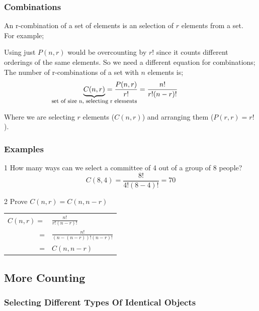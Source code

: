 \documentclass[12pt, letterpaper]{article}
\newcommand{\cul}[1]{%
		\uline{\phantom{#1}}%
		\llap{\contour{white}{#1}}%
	}
\newcommand{\exheader}[1][ex]{{\tiny{#1}\normalsize}}
\newcommand{\intextnote}[1][Also Note Lorem Ipsum]{{
				\emph{
					\begin{small}
					\begin{quote}
						\faInfoCircle\space
						{#1}
					\end{quote}
					\end{small}
		}
	}}
\begin{document}
\pagebreak

\subsubsection{Combinations} 
An r-combination of a set of elements is an \cul{unordered} selection of $r$ elements from a set. \\ 
For example;

\bigbreak

Using just $P(n,r)$ would be overcounting by $r!$ since it counts different orderings of the same elements. So we need a different equation for combinations; \smallbreak
The number of r-combinations of a set with $n$ elements is; 
\[
	\underbrace{C(n,r)}_{\makebox[0pt]{\footnotesize set of size n, selecting r elements}} = \frac{P(n,r)}{r!} = \frac{n!}{r!(n-r)!}
	\]

Where we are selecting $r$ elements ($C(n,r)$) and arranging them ($P(r,r) = r!$).

\bigbreak

\subsubsection*{Examples}

\exheader[1] How many ways can we select a committee of 4 out of a group of 8 people?
\[
	C(8,4) = \frac{8!}{4!(8-4)!} = 70
\]

\bigbreak

\exheader[2] Prove $C(n,r) = C(n, n-r)$ \smallbreak
\begin{tabular}{r l}
	$C(n,r) = $ & $\frac{n!}{r!(n-r)!}$ \\
	= & $\frac{n!}{(n-(n-r))!(n-r)!}$ \\
	= & $C(n,n-r)$
\end{tabular}

\pagebreak

\subsection{More Counting}
\bigbreak
\subsubsection{Selecting Different Types Of Identical Objects}
\end{document}
